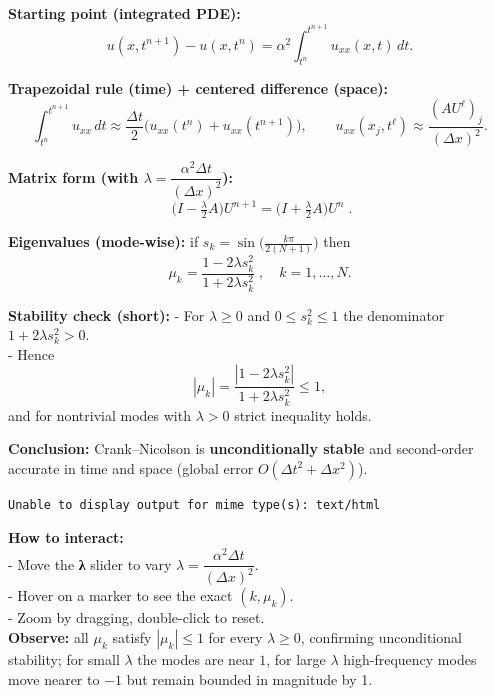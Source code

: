 \documentclass[
  letterpaper,
]{book}
\begin{document}
\begin{tcolorbox}[enhanced jigsaw, toprule=.15mm, opacityback=0, rightrule=.15mm, breakable, colframe=quarto-callout-note-color-frame, coltitle=black, toptitle=1mm, titlerule=0mm, left=2mm, bottomrule=.15mm, leftrule=.75mm, colback=white, colbacktitle=quarto-callout-note-color!10!white, bottomtitle=1mm, opacitybacktitle=0.6, title=\textcolor{quarto-callout-note-color}{\faInfo}\hspace{0.5em}{Crank--Nicolson: derivation summary \& stability}, arc=.35mm]

\textbf{Starting point (integrated PDE):} \[
u(x,t^{n+1})-u(x,t^n)=\alpha^2\int_{t^n}^{t^{n+1}} u_{xx}(x,t)\,dt.
\]

\textbf{Trapezoidal rule (time) + centered difference (space):} \[
\int_{t^n}^{t^{n+1}} u_{xx}\,dt
\approx \frac{\Delta t}{2}\big(u_{xx}(t^n)+u_{xx}(t^{n+1})\big),
\qquad
u_{xx}(x_j,t^\ell)\approx \frac{(AU^\ell)_j}{(\Delta x)^2}.
\]

\textbf{Matrix form (with
\(\lambda=\dfrac{\alpha^2\Delta t}{(\Delta x)^2}\)):} \[
\boxed{\;\Big(I-\tfrac{\lambda}{2}A\Big)U^{n+1} = \Big(I+\tfrac{\lambda}{2}A\Big)U^n\;.}
\]

\textbf{Eigenvalues (mode-wise):} if
\(s_k=\sin\!\big(\tfrac{k\pi}{2(N+1)}\big)\) then \[
\boxed{\;\mu_k=\frac{1-2\lambda s_k^2}{1+2\lambda s_k^2}\;, \quad k=1,\dots,N. \;}
\]

\textbf{Stability check (short):} - For \(\lambda\ge0\) and
\(0\le s_k^2\le1\) the denominator \(1+2\lambda s_k^2>0\).\\
- Hence \[
|\mu_k|=\frac{|1-2\lambda s_k^2|}{1+2\lambda s_k^2}\le1,
\] and for nontrivial modes with \(\lambda>0\) strict inequality holds.

\textbf{Conclusion:} Crank--Nicolson is \textbf{unconditionally stable}
and second-order accurate in time and space (global error
\(O(\Delta t^2+\Delta x^2)\)).

\end{tcolorbox}

\begin{verbatim}
Unable to display output for mime type(s): text/html
\end{verbatim}

\textbf{How to interact:}\\
- Move the \textbf{λ} slider to vary
\(\lambda=\dfrac{\alpha^2\Delta t}{(\Delta x)^2}\).\\
- Hover on a marker to see the exact \((k,\mu_k)\).\\
- Zoom by dragging, double-click to reset.\\
\textbf{Observe:} all \(\mu_k\) satisfy \(|\mu_k|\le1\) for every
\(\lambda\ge0\), confirming unconditional stability; for small
\(\lambda\) the modes are near \(1\), for large \(\lambda\)
high-frequency modes move nearer to \(-1\) but remain bounded in
magnitude by 1.
\end{document}
